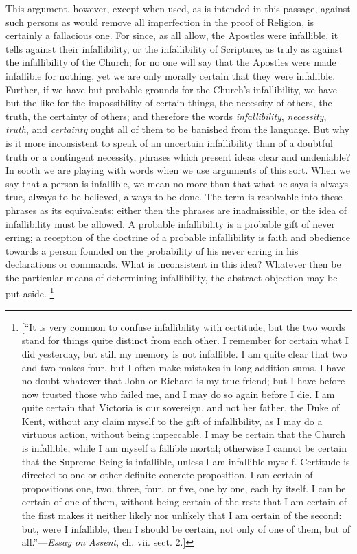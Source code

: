 This argument, however, except when used, as is
intended in this passage, against such persons as would
remove all imperfection in the proof of Religion, is
certainly a fallacious one. For since, as all allow, the
Apostles were infallible, it tells against their
infallibility, or the infallibility of Scripture, as
truly as against the infallibility of the Church; for no
one will say that the Apostles were made infallible for
nothing, yet we are only morally certain that they were
infallible. Further, if we have but probable grounds for
the Church's infallibility, we have but the like for the
impossibility of certain things, the necessity of others,
the truth, the certainty of others; and therefore the
words \emph{infallibility}, \emph{necessity}, \emph{truth},
and \emph{certainty} ought all of them to be banished
from the language. But why is it more inconsistent to
speak of an uncertain infallibility than of a doubtful
truth or a contingent necessity, phrases which present
ideas clear and undeniable? In sooth we are playing with
words when we use arguments of this sort. When we say
that a person is infallible, we mean no more than that
what he says is always true, always to be believed,
always to be done. The term is resolvable into these
phrases as its equivalents; either then the phrases are
inadmissible, or the idea of infallibility must be
allowed. A probable infallibility is a probable gift of
never erring; a reception of the doctrine of a probable
infallibility is faith and obedience towards a person
founded on the probability of his never erring in his
declarations or commands. What is inconsistent in this
idea? Whatever then be the particular means of
determining infallibility, the abstract objection may be
put aside. \footnote{[``It is very common to
confuse infallibility with certitude, but the two words
stand for things quite distinct from each other. I
remember for certain what I did yesterday, but still my
memory is not infallible. I am quite clear that two and
two makes four, but I often make mistakes in long
addition sums. I have no doubt whatever that John or
Richard is my true friend; but I have before now trusted
those who failed me, and I may do so again before I die.
I am quite certain that Victoria is our sovereign, and
not her father, the Duke of Kent, without any claim
myself to the gift of infallibility, as I may do a
virtuous action, without being impeccable. I may be
certain that the Church is infallible, while I am myself
a fallible mortal; otherwise I cannot be certain that the
Supreme Being is infallible, unless I am infallible
myself. Certitude is directed to one or other definite
concrete proposition. I am certain of propositions one,
two, three, four, or five, one by one, each by itself. I
can be certain of one of them, without being certain of
the rest: that I am certain of the first makes it neither
likely nor unlikely that I am certain of the second: but,
were I infallible, then I should be certain, not only of
one of them, but of all.''—\emph{Essay on Assent}, ch.
vii. sect. 2.]}

